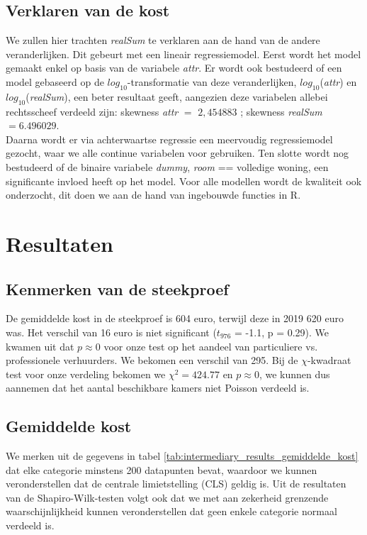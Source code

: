 \documentclass[a4paper]{kulakarticle}
\begin{document}
	\subsection{Verklaren van de kost}
	
	We zullen hier trachten \textit{realSum} te verklaren aan de hand van de andere veranderlijken. Dit gebeurt met een lineair regressiemodel. Eerst wordt het model gemaakt enkel op basis van de variabele \textit{attr}. Er wordt ook bestudeerd of een model gebaseerd op de $log_{10}$-transformatie van deze veranderlijken, $log_{10}$(\textit{attr}) en $log_{10}$(\textit{realSum}), een beter resultaat geeft, aangezien deze variabelen allebei rechtsscheef verdeeld zijn: skewness \textit{attr} $=$ $2,454883$ ; skewness \textit{realSum} $=6.496029$.\\
	Daarna wordt er via achterwaartse regressie een meervoudig regressiemodel gezocht, waar we alle continue variabelen voor gebruiken. Ten slotte wordt nog bestudeerd of de binaire variabele \textit{dummy}, \textit{room} == volledige woning, een significante invloed heeft op het model. Voor alle modellen wordt de kwaliteit ook onderzocht, dit doen we aan de hand van ingebouwde functies in R. 
	
	
	\section{Resultaten}
	
	\subsection{Kenmerken van de steekproef}
De gemiddelde kost in de steekproef is 604 euro, terwijl deze in 2019 620 euro was. Het verschil van 16 euro is niet significant ($t_{976}$ = -1.1, p = 0.29). We kwamen uit dat $p \approx 0$ voor onze test op het aandeel van particuliere vs. professionele verhuurders. We bekomen een verschil van 295. Bij de $\chi$-kwadraat test voor onze verdeling bekomen we $\chi^2 = 424.77$ en $p \approx 0$, we kunnen dus aannemen dat het aantal beschikbare kamers niet Poisson verdeeld is.
	
	\subsection{Gemiddelde kost}
	
	We merken uit de gegevens in tabel \ref{tab:intermediary_results_gemiddelde_kost} dat elke categorie minstens 200 datapunten bevat, waardoor we kunnen veronderstellen dat de centrale limietstelling (CLS) geldig is. Uit de resultaten van de Shapiro-Wilk-testen volgt ook dat we met aan zekerheid grenzende waarschijnlijkheid kunnen veronderstellen dat geen enkele categorie normaal verdeeld is.
	
\end{document}
